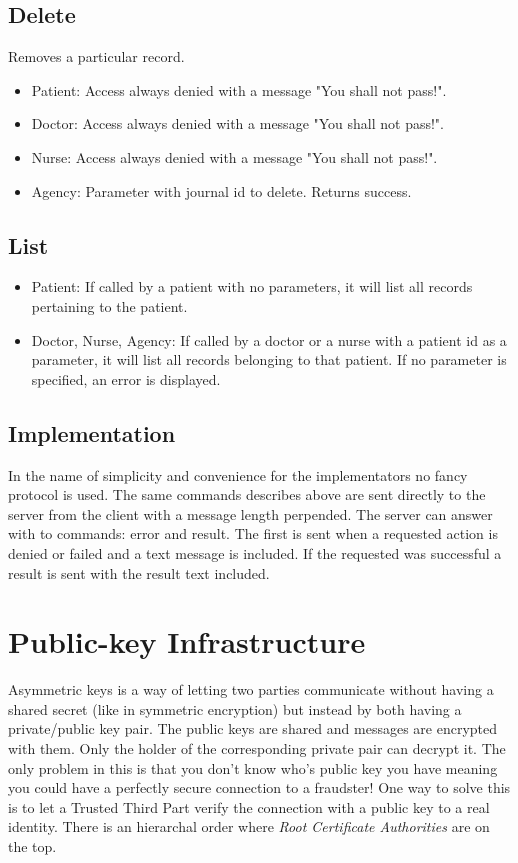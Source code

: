 \documentclass[10pt, a4paper]{article}
\begin{document}
\subsection{Delete}
Removes a particular record.
\begin{itemize}
\item Patient: Access always denied with a message "You shall not pass!".
\item Doctor: Access always denied with a message "You shall not pass!".
\item Nurse: Access always denied with a message "You shall not pass!".
\item Agency: Parameter with journal id to delete. Returns success.
\end{itemize}

\subsection{List}
\begin{itemize}
\item Patient: If called by a patient with no parameters, it will list all records pertaining to the patient.
\item Doctor, Nurse, Agency: If called by a doctor or a nurse with a patient id as a parameter, it will list all records belonging to that patient. If no parameter is specified, an error is displayed.
\end{itemize}

\subsection{Implementation}
In the name of simplicity and convenience for the implementators no fancy protocol is used. The same commands describes above are sent directly to the server from the client with a message length perpended. The server can answer with to commands: error and result. The first is sent when a requested action is denied or failed and a text message is included. If the requested was successful a result is sent with the result text included.

\section{Public-key Infrastructure}
\label{sec+pki}

Asymmetric keys is a way of letting two parties communicate without having a shared secret (like in symmetric encryption) but instead by both having a private/public key pair. The public keys are shared and messages are encrypted with them. Only the holder of the corresponding private pair can decrypt it. The only problem in this is that you don't know who's public key you have meaning you could have a perfectly secure connection to a fraudster! One way to solve this is to let a Trusted Third Part verify the connection with a public key to a real identity. There is an hierarchal order where \emph{Root Certificate Authorities} are on the top. 
\end{document}
